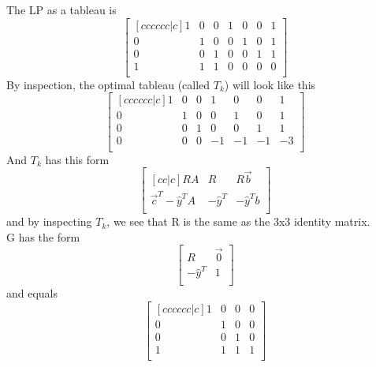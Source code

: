 \documentclass[12pt]{article}
\newenvironment{exercise}[2][Exercise]{\begin{trivlist}
		\item[\hskip \labelsep {\bfseries #1}\hskip \labelsep {\bfseries #2.}]}{\end{trivlist}}
\begin{document}
\begin{exercise}{4}
		The LP as a tableau is\\
		\[\begin{bmatrix}[cccccc|c]
			1 & 0 & 0 & 1 & 0 & 0 & 1 \\
			0 & 1 & 0 & 0 & 1 & 0 & 1 \\
			0 & 0 & 1 & 0 & 0 & 1 & 1 \\
			1 & 1 & 1 & 0 & 0 & 0 & 0 \\
		\end{bmatrix}\]
		By inspection, the optimal tableau (called $T_k$) will look like this
		\[\begin{bmatrix}[cccccc|c]
			1 & 0 & 0 & 1 & 0 & 0 & 1 \\
			0 & 1 & 0 & 0 & 1 & 0 & 1 \\
			0 & 0 & 1 & 0 & 0 & 1 & 1 \\
			0 & 0 & 0 & -1 & -1 & -1 & -3 \\
		\end{bmatrix}\]
		And $T_k$ has this form
		\[\begin{bmatrix}[cc|c]
			RA & R & R\vec{b} \\
			\vec{c}^T-\hat{y}^TA & -\hat{y}^T & -\hat{y}^Tb \\
		\end{bmatrix}\]
		and by inspecting $T_k$, we see that R is the same as the 3x3 identity matrix.\\
		G has the form
		\[\begin{bmatrix}
			R & \vec{0} \\
			-\hat{y}^T & 1 \\
		\end{bmatrix}\]
		and equals
		\[\begin{bmatrix}[cccccc|c]
			1 & 0 & 0 & 0 \\
			0 & 1 & 0 & 0 \\
			0 & 0 & 1 & 0 \\
			1 & 1 & 1 & 1 \\
		\end{bmatrix}\]
		
	\end{exercise}
	
	
\end{document}
